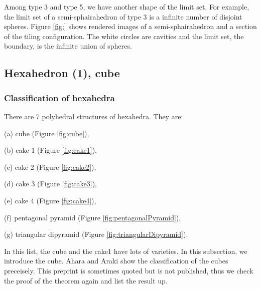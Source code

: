 \documentclass[suppldata, dvipdfmx]{interact}
\theoremstyle{plain}%
\theoremstyle{definition}
\theoremstyle{remark}
\theoremstyle{problemstyle}
\begin{document}
Among type 3 and type 5, we have another shape of the limit set.  For example, the limit set of a semi-sphairahedron of type 3 is a infinite number of disjoint spheres. Figure \ref{fig:} shows rendered images of a semi-sphairahedron and a section of the tiling configuration.  The white circles are cavities and the limit set, the boundary, is the infinite union of spheres.   
 




\subsection{Hexahedron (1), cube}

\subsubsection{Classification of hexahedra}

There are 7 polyhedral structures of hexahedra.  They are:\par
(a) cube (Figure \ref{fig:cube}),\par
(b) cake 1 (Figure \ref{fig:cake1}),\par
(c) cake 2 (Figure \ref{fig:cake2}),\par
(d) cake 3 (Figure \ref{fig:cake3}),\par
(e) cake 4 (Figure \ref{fig:cake4}),\par
(f) pentagonal pyramid (Figure \ref{fig:pentagonalPyramid}),\par
(g) triangular dipyramid (Figure \ref{fig:triangularDipyramid}).\par

In this list, the cube and the cake1 have lots of varieties.  In this subsection, we introduce the cube.  Ahara and Araki \cite{AharaAraki2} show the classification of the cubes preceisely.  This preprint is sometimes quoted but is not published, thus we check the proof of the theorem again and list the result up.
\end{document}
